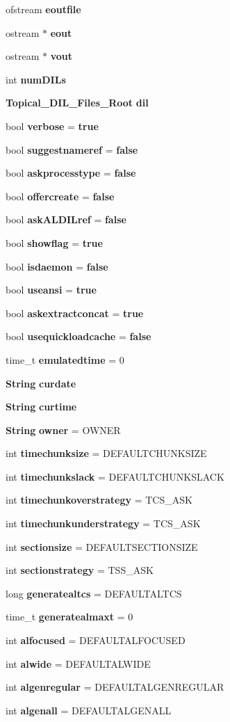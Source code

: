 \begin{CompactItemize}
\item 
ofstream {\bf eoutfile}
\item 
ostream $\ast$ {\bf eout}
\item 
ostream $\ast$ {\bf vout}
\item 
int {\bf num\-DILs}
\item 
{\bf Topical\_\-DIL\_\-Files\_\-Root} {\bf dil}
\item 
bool {\bf verbose} = {\bf true}
\item 
bool {\bf suggestnameref} = {\bf false}
\item 
bool {\bf askprocesstype} = {\bf false}
\item 
bool {\bf offercreate} = {\bf false}
\item 
bool {\bf ask\-ALDILref} = {\bf false}
\item 
bool {\bf showflag} = {\bf true}
\item 
bool {\bf isdaemon} = {\bf false}
\item 
bool {\bf useansi} = {\bf true}
\item 
bool {\bf askextractconcat} = {\bf true}
\item 
bool {\bf usequickloadcache} = {\bf false}
\item 
time\_\-t {\bf emulatedtime} = 0
\item 
{\bf String} {\bf curdate}
\item 
{\bf String} {\bf curtime}
\item 
{\bf String} {\bf owner} = OWNER
\item 
int {\bf timechunksize} = DEFAULTCHUNKSIZE
\item 
int {\bf timechunkslack} = DEFAULTCHUNKSLACK
\item 
int {\bf timechunkoverstrategy} = TCS\_\-ASK
\item 
int {\bf timechunkunderstrategy} = TCS\_\-ASK
\item 
int {\bf sectionsize} = DEFAULTSECTIONSIZE
\item 
int {\bf sectionstrategy} = TSS\_\-ASK
\item 
long {\bf generatealtcs} = DEFAULTALTCS
\item 
time\_\-t {\bf generatealmaxt} = 0
\item 
int {\bf alfocused} = DEFAULTALFOCUSED
\item 
int {\bf alwide} = DEFAULTALWIDE
\item 
int {\bf algenregular} = DEFAULTALGENREGULAR
\item 
int {\bf algenall} = DEFAULTALGENALL
\item 

\end{CompactItemize}
